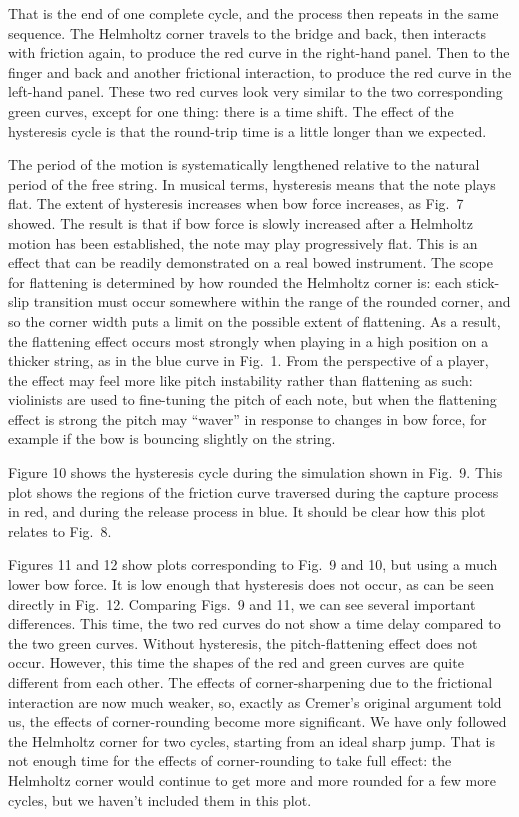   That is the end of one complete cycle, and the process then repeats in the 
  same sequence. The Helmholtz corner travels to the bridge and back, then 
  interacts with friction again, to produce the red curve in the right-hand 
  panel. Then to the finger and back and another frictional interaction, to 
  produce the red curve in the left-hand panel. These two red curves look very 
  similar to the two corresponding green curves, except for one thing: there is 
  a time shift. The effect of the hysteresis cycle is that the round-trip time 
  is a little longer than we expected. 

  The period of the motion is systematically lengthened relative to the natural 
  period of the free string. In musical terms, hysteresis means that the note 
  plays flat. The extent of hysteresis increases when bow force increases, as 
  Fig.\ 7 showed. The result is that if bow force is slowly increased after a 
  Helmholtz motion has been established, the note may play progressively flat. 
  This is an effect that can be readily demonstrated on a real bowed 
  instrument. The scope for flattening is determined by how rounded the 
  Helmholtz corner is: each stick-slip transition must occur somewhere within 
  the range of the rounded corner, and so the corner width puts a limit on the 
  possible extent of flattening. As a result, the flattening effect occurs most 
  strongly when playing in a high position on a thicker string, as in the blue 
  curve in Fig.\ 1. From the perspective of a player, the effect may feel more 
  like pitch instability rather than flattening as such: violinists are used to 
  fine-tuning the pitch of each note, but when the flattening effect is strong 
  the pitch may ``waver'' in response to changes in bow force, for example if 
  the bow is bouncing slightly on the string. 

  Figure 10 shows the hysteresis cycle during the simulation shown in Fig.\ 9. 
  This plot shows the regions of the friction curve traversed during the 
  capture process in red, and during the release process in blue. It should be 
  clear how this plot relates to Fig.\ 8. 

  Figures 11 and 12 show plots corresponding to Fig.\ 9 and 10, but using a 
  much lower bow force. It is low enough that hysteresis does not occur, as can 
  be seen directly in Fig.\ 12. Comparing Figs.\ 9 and 11, we can see several 
  important differences. This time, the two red curves do not show a time delay 
  compared to the two green curves. Without hysteresis, the pitch-flattening 
  effect does not occur. However, this time the shapes of the red and green 
  curves are quite different from each other. The effects of corner-sharpening 
  due to the frictional interaction are now much weaker, so, exactly as 
  Cremer’s original argument told us, the effects of corner-rounding become 
  more significant. We have only followed the Helmholtz corner for two cycles, 
  starting from an ideal sharp jump. That is not enough time for the effects of 
  corner-rounding to take full effect: the Helmholtz corner would continue to 
  get more and more rounded for a few more cycles, but we haven’t included them 
  in this plot. 

